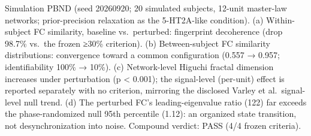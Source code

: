 \documentclass[
]{article}
\begin{document}
Simulation PBND (seed 20260920; 20 simulated subjects, 12-unit
master-law networks; prior-precision relaxation as the 5-HT2A-like
condition). (a) Within-subject FC similarity, baseline vs.~perturbed:
fingerprint decoherence (drop 98.7\% vs.~the frozen {≥}30\% criterion).
(b) Between-subject FC similarity distributions: convergence toward a
common configuration (0.557 {→} 0.957; identifiability 100\% {→} 10\%).
(c) Network-level Higuchi fractal dimension increases under perturbation
({p \textless{} 0.001}); the signal-level (per-unit) effect is reported
separately with no criterion, mirroring the disclosed Varley et
al.~signal-level null trend. (d) The perturbed FC's leading-eigenvalue
ratio (122) far exceeds the phase-randomized null 95th percentile
(1.12): an organized state transition, not desynchronization into noise.
Compound verdict: PASS (4/4 frozen criteria).
\end{document}
